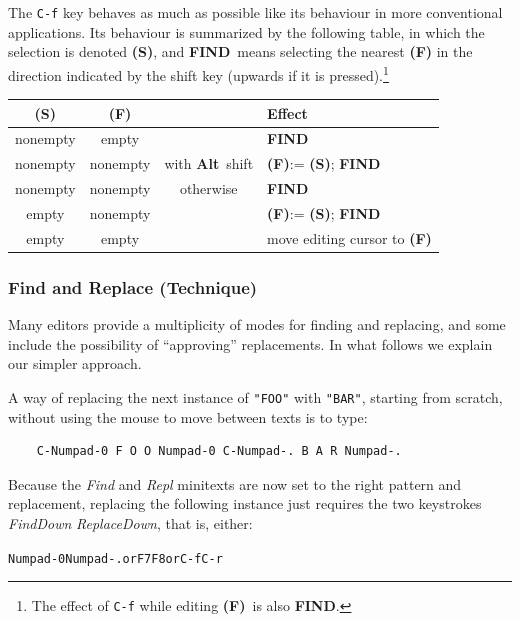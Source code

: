 \documentclass[11pt,a4paper]{article}
\begin{document}
\def\SEL{\textbf{(S)}}
\def\FND{\textbf{(F)}}
\def\FIND{\textbf{FIND}}
\def\ALT{\textbf{Alt}}
The \texttt{C-f}  key behaves as much as possible like its behaviour in
more conventional applications. Its behaviour is summarized by the following table, in
which the selection is denoted \textbf{(S)}, and \FIND\ means selecting
the nearest \textbf{(F)} in the direction indicated by the shift key (upwards if it is
pressed).\footnote{The effect of \texttt{C-f} while editing
\FND\ is also \FIND.} 
\begin{center}
\begin{tabular}{|c|c|c|l|}
\hline
\SEL&\FND&&Effect\\\hline
nonempty&empty&&\FIND \\
nonempty&nonempty&with \ALT\ shift& \FND := \SEL; \FIND\\
nonempty&nonempty&otherwise&  \FIND\\
empty&nonempty&&\FND := \SEL; \FIND\\
empty&empty&&move editing cursor to \FND\\
\hline
\end{tabular}
\end{center}



\hypertarget{find-and-replace-technique}{%
\subsubsection{Find and Replace
(Technique)}\label{find-and-replace-technique}}

Many editors provide a multiplicity of modes for finding and replacing,
and some include the possibility of ``approving'' replacements. In what
follows we explain our simpler approach.

A way of replacing the next instance of \texttt{"FOO"} with
\texttt{"BAR"}, starting from scratch, without using the mouse to
move between texts is to type:

\begin{verbatim}
    C-Numpad-0 F O O Numpad-0 C-Numpad-. B A R Numpad-.
\end{verbatim}

Because the \emph{Find} and \emph{Repl} minitexts are now set
to the right pattern and replacement, replacing the following
instance just requires the two keystrokes \emph{FindDown} \emph{ReplaceDown},
that is, either:
\begin{alltt}
    Numpad-0 Numpad-.      \textrm{or}   F7 F8      \textrm{or}   C-f C-r 
\end{alltt}
\end{document}
